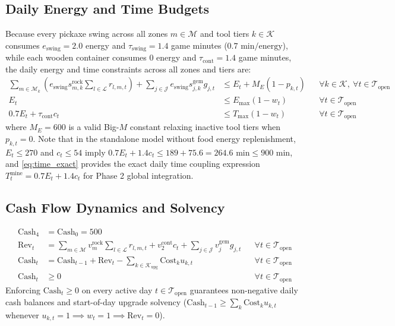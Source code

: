 \documentclass[11pt,a4paper]{article}
\begin{document}
\subsection{Daily Energy and Time Budgets}
Because every pickaxe swing across all zones $m \in \mathcal{M}$ and tool tiers $k \in \mathcal{K}$ consumes $e_{\text{swing}} = 2.0$ energy and $\tau_{\text{swing}} = 1.4$ game minutes ($0.7\text{ min/energy}$), while each wooden container consumes $0$ energy and $\tau_{\text{cont}} = 1.4$ game minutes, the daily energy and time constraints across all zones and tiers are:
\begin{align}
    \sum_{m \in \mathcal{M}_k} \left(e_{\text{swing}} s_{m,k}^{\text{rock}} \sum_{l \in \mathcal{L}} r_{l,m,t}\right) + \sum_{j \in \mathcal{J}} e_{\text{swing}} s_{j,k}^{\text{gem}} g_{j,t} &\le E_t + M_E (1 - p_{k,t}) && \forall k \in \mathcal{K},\ \forall t \in \mathcal{T}_{\text{open}} \\
    E_t &\le E_{\max} (1 - w_t) && \forall t \in \mathcal{T}_{\text{open}} \\
    0.7 E_t + \tau_{\text{cont}} c_t &\le T_{\max} (1 - w_t) && \forall t \in \mathcal{T}_{\text{open}} \label{eq:time_exact}
\end{align}
where $M_E = 600$ is a valid Big-$M$ constant relaxing inactive tool tiers when $p_{k,t} = 0$. Note that in the standalone model without food energy replenishment, $E_t \le 270$ and $c_t \le 54$ imply $0.7 E_t + 1.4 c_t \le 189 + 75.6 = 264.6\text{ min} \le 900\text{ min}$, and \eqref{eq:time_exact} provides the exact daily time coupling expression $T_t^{\text{mine}} = 0.7 E_t + 1.4 c_t$ for Phase 2 global integration.

\subsection{Cash Flow Dynamics and Solvency}
\begin{align}
    \text{Cash}_{4} &= \text{Cash}_0 = 500 \\
    \text{Rev}_t &= \sum_{m \in \mathcal{M}} v_m^{\text{rock}} \sum_{l \in \mathcal{L}} r_{l,m,t} + v_2^{\text{cont}} c_t + \sum_{j \in \mathcal{J}} v_j^{\text{gem}} g_{j,t} && \forall t \in \mathcal{T}_{\text{open}} \\
    \text{Cash}_t &= \text{Cash}_{t-1} + \text{Rev}_t - \sum_{k \in \mathcal{K}_{\text{upg}}} \text{Cost}_k u_{k,t} && \forall t \in \mathcal{T}_{\text{open}} \\
    \text{Cash}_t &\ge 0 && \forall t \in \mathcal{T}_{\text{open}}
\end{align}
Enforcing $\text{Cash}_t \ge 0$ on every active day $t \in \mathcal{T}_{\text{open}}$ guarantees non-negative daily cash balances and start-of-day upgrade solvency ($\text{Cash}_{t-1} \ge \sum_k \text{Cost}_k u_{k,t}$ whenever $u_{k,t} = 1 \implies w_t = 1 \implies \text{Rev}_t = 0$).
\end{document}

